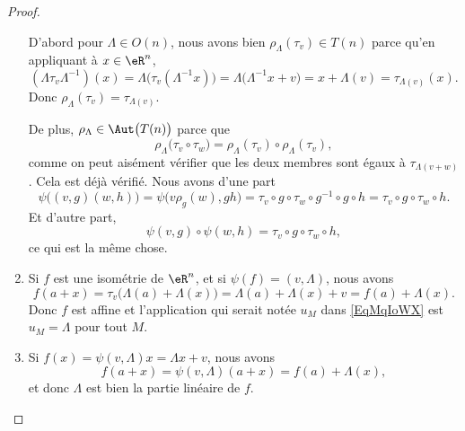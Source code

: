 \begin{proof}
\begin{enumerate}
\begin{subproof}
			      D'abord pour \( \Lambda\in O(n)\), nous avons bien \( \rho_{\Lambda}(\tau_v)\in T(n)\) parce qu'en appliquant à \( x\in \eR^n\),
			      \begin{equation}
				      (\Lambda\tau_v\Lambda^{-1})(x)=\Lambda\big( \tau_v(\Lambda^{-1} x) \big)=\Lambda\big( \Lambda^{-1}x+v \big)=x+\Lambda(v)=\tau_{\Lambda(v)}(x).
			      \end{equation}
			      Donc \( \rho_{\Lambda}(\tau_v)=\tau_{\Lambda(v)}\).

			      De plus, \( \rho_{\Lambda}\in\Aut\big( T(n) \big)\) parce que
			      \begin{equation}
				      \rho_{\Lambda}\big( \tau_v\circ \tau_w \big)=\rho_{\Lambda}(\tau_v)\circ\rho_{\Lambda}(\tau_v),
			      \end{equation}
			      comme on peut aisément vérifier que les deux membres sont égaux à \( \tau_{\Lambda(v+w)}\).
			      Cela est déjà vérifié.
			      Nous avons d'une part
			      \begin{equation}
				      \psi\big( (v,g)(w,h) \big)=\psi\big( v\rho_g(w),gh \big)=\tau_v\circ g\circ\tau_w\circ g^{-1}\circ g\circ h=\tau_v\circ g\circ\tau_w\circ h.
			      \end{equation}
			      Et d'autre part,
			      \begin{equation}
				      \psi(v,g)\circ\psi(w,h)=\tau_v\circ g\circ \tau_w\circ h,
			      \end{equation}
			      ce qui est la même chose.
		      \end{subproof}
		\item
		      Si \(f \) est une isométrie de \( \eR^n\), et si \( \psi(f)=(v,\Lambda)\), nous avons
		      \begin{equation}
			      f(a+x)=\tau_v\big( \Lambda(a)+\Lambda(x) \big)=\Lambda(a)+\Lambda(x)+v=f(a)+\Lambda(x).
		      \end{equation}
		      Donc \( f\) est affine et l'application qui serait notée \( u_M\) dans \eqref{EqMqIoWX} est \( u_M=\Lambda\) pour tout \( M\).
		\item
		      Si \( f(x)=\psi(v,\Lambda)x=\Lambda x+v\), nous avons
		      \begin{equation}
			      f(a+x)=\psi(v,\Lambda)(a+x)=f(a)+\Lambda(x),
		      \end{equation}
		      et donc \( \Lambda\) est bien la partie linéaire de \( f\).
	\end{enumerate}
\end{proof}

